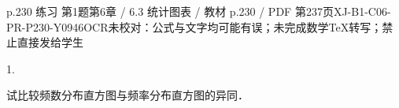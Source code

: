 \begin{bankitem}{p.230 练习 第1题}{第6章 / 6.3 统计图表 / 教材 p.230 / PDF 第237页}{XJ-B1-C06-PR-P230-Y0946}{OCR未校对：公式与文字均可能有误；未完成数学TeX转写；禁止直接发给学生}
\begin{ocrdraft}
\par
1.
\par
试比较频数分布直方图与频率分布直方图的异同．
\end{ocrdraft}
\end{bankitem}
